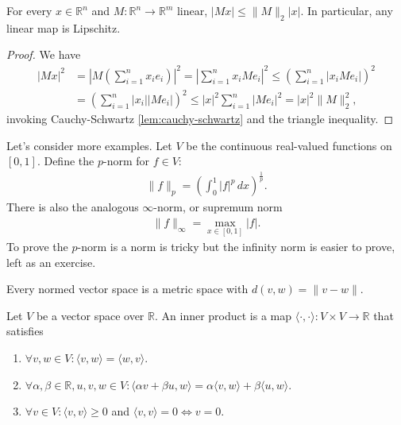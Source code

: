 \begin{lemma}\label{lem:hilbert-schmidt-norm}
    For every $x \in \mathbb{R}^{n}$ and $M: \mathbb{R}^{n} \to \mathbb{R}^{m}$ linear, $ \left| Mx \right| \leq \lVert M \rVert_{2} \left| x \right|$. In particular, any linear map is Lipschitz.
\end{lemma}
\begin{proof}
    We have 
    \begin{align*}
        \left| Mx \right|^{2} &= \left| M \left( \sum_{i=1}^{n} x_{i}e_{i} \right)  \right|^{2} = \left| \sum_{i=1}^{n} x_{i} M e_{i} \right|^{2} \leq \left(\sum_{i=1}^{n} \left| x_{i}Me_{i} \right| \right)^{2} \\ &= \left( \sum_{i=1}^{n} \left| x_{i} \right| \left| M e_{i} \right| \right)^{2} \leq \left| x \right|^{2} \sum_{i=1}^{n} \left| Me_{i} \right|^{2} = \left| x \right|^{2} \lVert M \rVert_{2}^{2}, 
    \end{align*}
    invoking Cauchy-Schwartz \ref{lem:cauchy-schwartz} and the triangle inequality.
\end{proof}

\begin{eg}
    Let's consider more examples. Let $V$ be the continuous real-valued functions on $[0,1]$. Define the $p$-norm for $f \in V$:
    \begin{align*}
        \lVert f \rVert_{p} = \left( \int_{0}^{1} |f|^{p} \, dx \right)^{\frac{1}{p}}.
    \end{align*}    
    There is also the analogous $\infty$-norm, or supremum norm
    \begin{align*}
        \lVert f \rVert_{\infty} = \max_{x \in [0,1]} \left| f \right|.
    \end{align*}
    To prove the $p$-norm is a norm is tricky but the infinity norm is easier to prove, left as an exercise.
\end{eg}

\begin{prop}\label{prop:norm_induces_metric}
    Every normed vector space is a metric space with $d(v,w) = \lVert v-w \rVert$.
\end{prop}

\begin{definition}\label{def:inner_prod_vs}
    Let $V$ be a vector space over $\mathbb{R}$. An inner product is a map $\langle \cdot ,\cdot  \rangle: V \times V \to \mathbb{R}$ that satisfies
    \begin{enumerate} 
        \item $\forall v, w \in V: \langle v,w \rangle=\langle w,v \rangle$.
        \item $\forall \alpha, \beta \in \mathbb{R}, u,v,w \in V: \langle \alpha v+ \beta u, w \rangle = \alpha \langle v,w \rangle + \beta \langle u,w \rangle$.
        \item $\forall v \in V: \langle v,v \rangle \geq 0$ and $\langle v,v \rangle = 0 \iff v = 0$.
    \end{enumerate}
\end{definition}

